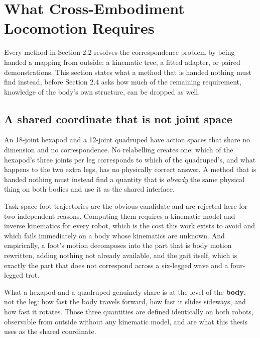 \documentclass[12pt,a4paper,oneside]{report}
\begin{document}
\section{What Cross-Embodiment Locomotion Requires}
Every method in Section 2.2 resolves the correspondence problem by being handed a mapping from
outside: a kinematic tree, a fitted adapter, or paired demonstrations. This section states what a
method that is handed nothing must find instead, before Section 2.4 asks how much of the remaining
requirement, knowledge of the body's own structure, can be dropped as well.

\subsection{A shared coordinate that is not joint space}
An 18-joint hexapod and a 12-joint quadruped have action spaces that share no dimension and no
correspondence. No relabelling creates one: which of the hexapod's three joints per leg corresponds to
which of the quadruped's, and what happens to the two extra legs, has no physically correct answer.
A method that is handed nothing must instead find a quantity that is \emph{already} the same physical
thing on both bodies and use it as the shared interface.

Task-space foot trajectories are the obvious candidate and are rejected here for two independent
reasons. Computing them requires a kinematic model and inverse kinematics for every robot, which is
the cost this work exists to avoid and which fails immediately on a body whose kinematics are unknown.
And empirically, a foot's motion decomposes into the part that is body motion rewritten, adding
nothing not already available, and the gait itself, which is exactly the part that does not
correspond across a six-legged wave and a four-legged trot.

What a hexapod and a quadruped genuinely share is at the level of the \textbf{body}, not the leg: how
fast the body travels forward, how fast it slides sideways, and how fast it rotates. Those three
quantities are defined identically on both robots, observable from outside without any kinematic
model, and are what this thesis uses as the shared coordinate.
\end{document}
